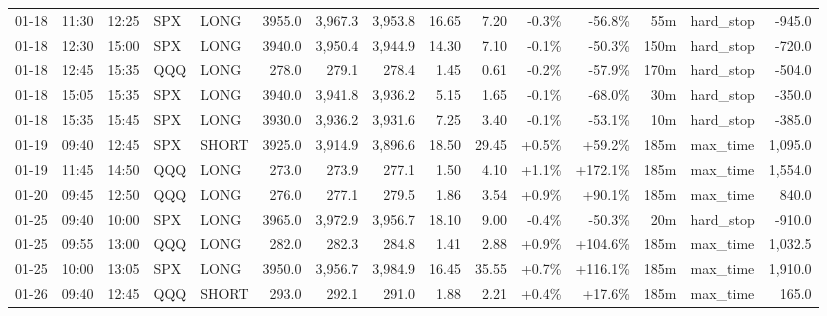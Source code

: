 \documentclass[11pt,a4paper,twoside]{article}
\begin{document}
\begin{landscape}
\begin{center}
\begin{longtable}{>{\color{txtmain}}l l l l l r r r r r r r r >{\color{txtmain}}l r}
01-18 & 11:30 & 12:25 & SPX & LONG & 3955.0 & 3,967.3 & 3,953.8 & 16.65 & 7.20 & \textcolor{lossred}{-0.3\%} & \textcolor{lossred}{-56.8\%} & 55m & hard\_stop & \textcolor{lossred}{-945.0} \\
01-18 & 12:30 & 15:00 & SPX & LONG & 3940.0 & 3,950.4 & 3,944.9 & 14.30 & 7.10 & \textcolor{lossred}{-0.1\%} & \textcolor{lossred}{-50.3\%} & 150m & hard\_stop & \textcolor{lossred}{-720.0} \\
01-18 & 12:45 & 15:35 & QQQ & LONG & 278.0 & 279.1 & 278.4 & 1.45 & 0.61 & \textcolor{lossred}{-0.2\%} & \textcolor{lossred}{-57.9\%} & 170m & hard\_stop & \textcolor{lossred}{-504.0} \\
01-18 & 15:05 & 15:35 & SPX & LONG & 3940.0 & 3,941.8 & 3,936.2 & 5.15 & 1.65 & \textcolor{lossred}{-0.1\%} & \textcolor{lossred}{-68.0\%} & 30m & hard\_stop & \textcolor{lossred}{-350.0} \\
01-18 & 15:35 & 15:45 & SPX & LONG & 3930.0 & 3,936.2 & 3,931.6 & 7.25 & 3.40 & \textcolor{lossred}{-0.1\%} & \textcolor{lossred}{-53.1\%} & 10m & hard\_stop & \textcolor{lossred}{-385.0} \\
01-19 & 09:40 & 12:45 & SPX & SHORT & 3925.0 & 3,914.9 & 3,896.6 & 18.50 & 29.45 & \textcolor{wingreen}{+0.5\%} & \textcolor{wingreen}{+59.2\%} & 185m & max\_time & \textcolor{wingreen}{1,095.0} \\
01-19 & 11:45 & 14:50 & QQQ & LONG & 273.0 & 273.9 & 277.1 & 1.50 & 4.10 & \textcolor{wingreen}{+1.1\%} & \textcolor{wingreen}{+172.1\%} & 185m & max\_time & \textcolor{wingreen}{1,554.0} \\
01-20 & 09:45 & 12:50 & QQQ & LONG & 276.0 & 277.1 & 279.5 & 1.86 & 3.54 & \textcolor{wingreen}{+0.9\%} & \textcolor{wingreen}{+90.1\%} & 185m & max\_time & \textcolor{wingreen}{840.0} \\
01-25 & 09:40 & 10:00 & SPX & LONG & 3965.0 & 3,972.9 & 3,956.7 & 18.10 & 9.00 & \textcolor{lossred}{-0.4\%} & \textcolor{lossred}{-50.3\%} & 20m & hard\_stop & \textcolor{lossred}{-910.0} \\
01-25 & 09:55 & 13:00 & QQQ & LONG & 282.0 & 282.3 & 284.8 & 1.41 & 2.88 & \textcolor{wingreen}{+0.9\%} & \textcolor{wingreen}{+104.6\%} & 185m & max\_time & \textcolor{wingreen}{1,032.5} \\
01-25 & 10:00 & 13:05 & SPX & LONG & 3950.0 & 3,956.7 & 3,984.9 & 16.45 & 35.55 & \textcolor{wingreen}{+0.7\%} & \textcolor{wingreen}{+116.1\%} & 185m & max\_time & \textcolor{wingreen}{1,910.0} \\
01-26 & 09:40 & 12:45 & QQQ & SHORT & 293.0 & 292.1 & 291.0 & 1.88 & 2.21 & \textcolor{wingreen}{+0.4\%} & \textcolor{wingreen}{+17.6\%} & 185m & max\_time & \textcolor{wingreen}{165.0} \\

\end{longtable}
\end{center}
\end{landscape}
\end{document}
